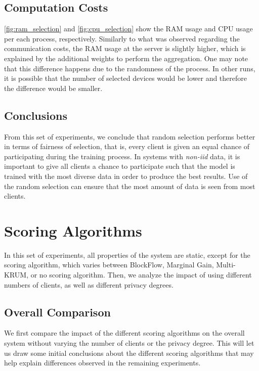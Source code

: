\subsection{Computation Costs}

\autoref{fig:ram_selection} and \autoref{fig:cpu_selection} show the RAM usage and CPU usage per each process, respectively. Similarly to what was observed regarding the communication costs, the RAM usage at the server is slightly higher, which is explained by the additional weights to perform the aggregation. One may note that this difference happens due to the randomness of the process. In other runs, it is possible that the number of selected devices would be lower and therefore the difference would be smaller.

\subsection{Conclusions}

From this set of experiments, we conclude that random selection performs better in terms of fairness of selection, that is, every client is given an equal chance of participating during the training process. In systems with \textit{non-iid} data, it is important to give all clients a chance to participate such that the model is trained with the most diverse data in order to produce the best results. Use of the random selection can ensure that the most amount of data is seen from most clients.

\section{Scoring Algorithms}

In this set of experiments, all properties of the system are static, except for the scoring algorithm, which varies between BlockFlow, Marginal Gain, Multi-KRUM, or no scoring algorithm. Then, we analyze the impact of using different numbers of clients, as well as different privacy degrees.

\subsection{Overall Comparison}\label{horizontal:scoring_overall}

We first compare the impact of the different scoring algorithms on the overall system without varying the number of clients or the privacy degree. This will let us draw some initial conclusions about the different scoring algorithms that may help explain differences observed in the remaining experiments.


